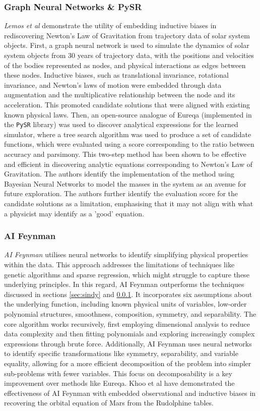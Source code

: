 \documentclass[fleqn,10pt]{olplainarticle}
\numberwithin{equation}{subsection}
\begin{document}
\subsubsection{Graph Neural Networks \& PySR}\label{sec:gnn}
\emph{Lemos et al} \cite{Lemos2023} demonstrate the utility of embedding inductive biases in rediscovering Newton's Law of Gravitation from trajectory data of solar system objects. First, a graph neural network is used to simulate the dynamics of solar system objects from 30 years of trajectory data, with the positions and velocities of the bodies represented as nodes, and physical interactions as edges between these nodes. Inductive biases, such as translational invariance, rotational invariance, and Newton's laws of motion were embedded through data augmentation and the multiplicative relationship between the node and its acceleration. This promoted candidate solutions that were aligned with existing known physical laws. Then, an open-source analogue of Eureqa (implemented in the \lstinline{PySR} library) was used to discover analytical expressions for the learned simulator, where a tree search algorithm was used to produce a set of candidate functions, which were evaluated using a score corresponding to the ratio between accuracy and parsimony. This two-step method has been shown to be effective and efficient in discovering analytic equations corresponding to Newton's Law of Gravitation. The authors identify the implementation of the method using Bayesian Neural Networks to model the masses in the system as an avenue for future exploration. The authors further identify the evaluation score for the candidate solutions as a limitation, emphasising that it may not align with what a physicist may identify as a 'good' equation.

\subsubsection{AI Feynman}
\emph{AI Feynman} \cite{Udrescu2020} utilises neural networks to identify simplifying physical properties within the data. This approach addresses the limitations of techniques like genetic algorithms and sparse regression, which might struggle to capture these underlying principles. In this regard, AI Feynman outperforms the techniques discussed in sections \ref{sec:sindy} and \ref{sec:gnn}. It incorporates six assumptions about the underlying function, including known physical units of variables, low-order polynomial structures, smoothness, composition, symmetry, and separability. The core algorithm works recursively, first employing dimensional analysis to reduce data complexity and then fitting polynomials and exploring increasingly complex expressions through brute force. Additionally, AI Feynman uses neural networks to identify specific transformations like symmetry, separability, and variable equality, allowing for a more efficient decomposition of the problem into simpler sub-problems with fewer variables. This focus on decomposability is a key improvement over methods like Eureqa. Khoo et al \cite{Khoo2023.1} have demonstrated the effectiveness of AI Feynman with embedded observational and inductive biases in recovering the orbital equation of Mars from the Rudolphine tables.
\end{document}
